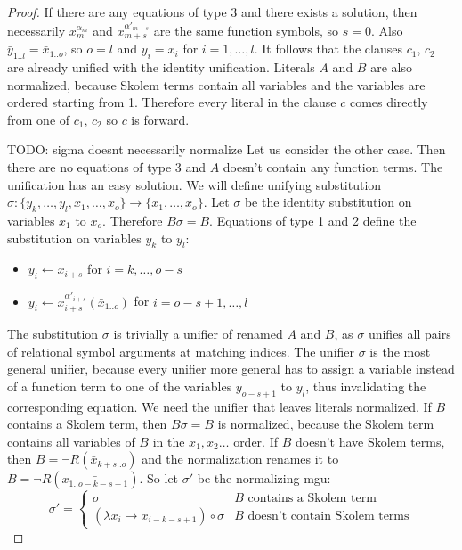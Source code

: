 \documentclass[english, shortabstract]{iithesis}
\theoremstyle{definition} \newtheorem{definition}{Definition}[chapter]
\theoremstyle{remark} \newtheorem{remark}[definition]{Observation}
\theoremstyle{plain} \newtheorem{theorem}[definition]{Theorem}
\theoremstyle{plain} \newtheorem{lemma}[definition]{Lemma}
\begin{document}
\begin{proof}
If there are any equations of type 3 and there exists a solution, then
necessarily $x^{\alpha_m}_m$ and $x^{\alpha'_{m+s}}_{m+s}$ are the same function symbols, so $s=0$.
Also $\bar{y}_{1..l}=\bar{x}_{1..o}$, so $o=l$ and $y_i=x_i$ for $i=1,\dots,l$.
It follows that the clauses $c_1$, $c_2$ are already unified with the identity unification.
Literals $A$ and $B$ are also normalized, because Skolem terms contain all variables and the variables are ordered starting from 1.
Therefore every literal in the clause $c$ comes directly from one of $c_1$, $c_2$ so $c$ is forward.

TODO: sigma doesnt necessarily normalize
Let us consider the other case. Then there are no equations of type 3 and $A$ doesn't contain any function terms.
The unification has an easy solution. %
We will define unifying substitution $\sigma : \{y_k,\dots,y_l, x_1, \dots, x_o\} \rightarrow \{x_1, \dots, x_o\}$.
Let $\sigma$ be the identity substitution on variables $x_1$ to $x_o$. Therefore $B\sigma=B$.
Equations of type 1 and 2 define the substitution on variables $y_k$ to $y_l$:
\begin{itemize}
    \item $y_i \leftarrow x_{i+s}$ for $i=k,\dots, o-s$
    \item $y_i \leftarrow x^{\alpha'_{i+s}}_{i+s}(\bar{x}_{1..o})$ for $i=o-s+1,\dots, l$
\end{itemize}
The substitution $\sigma$ is trivially a unifier of renamed $A$ and $B$, as
$\sigma$ unifies all pairs of relational symbol arguments at matching indices.
The unifier $\sigma$ is the most general unifier, because every unifier more general
has to assign a variable instead of a function term to one of the variables $y_{o-s+1}$ to $y_l$, 
thus invalidating the corresponding equation.
We need the unifier that leaves literals normalized. 
If $B$ contains a Skolem term, then $B\sigma=B$ is normalized, because the Skolem term contains all variables of $B$ in the $x_1,x_2\dots$ order.
If $B$ doesn't have Skolem terms, then $B=\lnot R(\bar{x}_{k+s..o})$ and the normalization renames it to $B=\lnot R(\bar{x_{1..o-k-s+1}})$.
So let $\sigma'$ be the normalizing mgu:
\begin{equation}
\sigma'=\begin{cases}
    \sigma &\text{$B$ contains a Skolem term} \\
    (\lambda x_i \rightarrow x_{i-k-s+1})\circ\sigma &\text{$B$ doesn't contain Skolem terms}
\end{cases}

\end{equation}
\end{proof}
\end{document}
